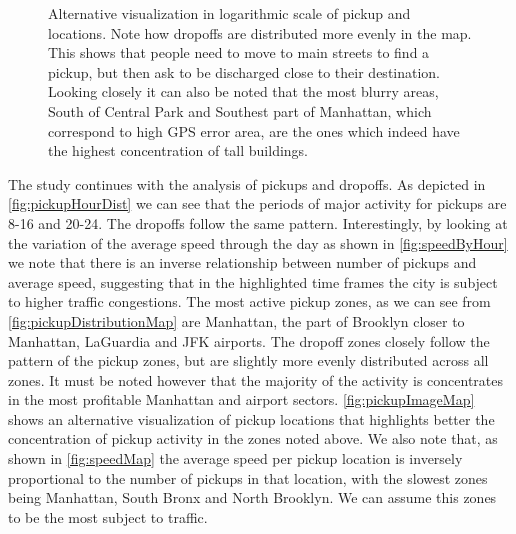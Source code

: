 \documentclass{acm_proc_article-sp-sigmod09}
\begin{document}
\begin{figure}
	\caption{Alternative visualization in logarithmic scale of pickup and locations. Note how dropoffs are distributed more evenly in the map. This shows that people need to move to main streets to find a pickup, but then ask to be discharged close to their destination. Looking closely it can also be noted that the most blurry areas, South of Central Park and Southest part of Manhattan, which correspond to high GPS error area, are the ones which indeed have the highest concentration of tall buildings.}
\end{figure}

The study continues with the analysis of pickups and dropoffs. As depicted in \cref{fig:pickupHourDist} we can see that the periods of major activity for pickups are 8-16 and 20-24. The dropoffs follow the same pattern. Interestingly, by looking at the variation of the average speed through the day as shown in \cref{fig:speedByHour} we note that there is an inverse relationship between number of pickups and average speed, suggesting that in the highlighted time frames the city is subject to higher traffic congestions.
The most active pickup zones, as we can see from \cref{fig:pickupDistributionMap} are Manhattan, the part of Brooklyn closer to Manhattan, LaGuardia and JFK airports. The dropoff zones closely follow the pattern of the pickup zones, but are slightly more evenly distributed across all zones. It must be noted however that the majority of the activity is concentrates in the most profitable Manhattan and airport sectors. \cref{fig:pickupImageMap} shows an alternative visualization of pickup locations that highlights better the concentration of pickup activity in the zones noted above.
We also note that, as shown in \cref{fig:speedMap} the average speed per pickup location is inversely proportional to the number of pickups in that location, with the slowest zones being Manhattan, South Bronx and North Brooklyn. We can assume this zones to be the most subject to traffic.
\end{document}
